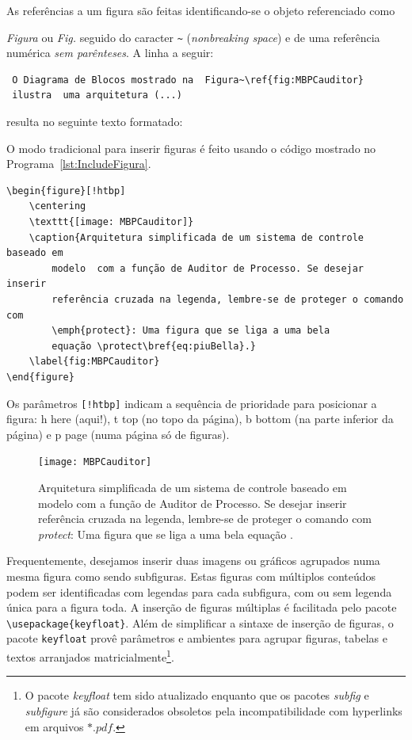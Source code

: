As referências a um figura  são feitas identificando-se o objeto referenciado como {\emph{Figura} ou \emph{Fig. } seguido do caracter \verb|~| (\emph{nonbreaking space}) e de uma referência numérica \textit{sem parênteses}. 
A linha a seguir:

\begin{verbatim}
 O Diagrama de Blocos mostrado na  Figura~\ref{fig:MBPCauditor} 
 ilustra  uma arquitetura (...)
\end{verbatim}

resulta no seguinte texto formatado:



O  modo tradicional para inserir figuras é feito usando o código  mostrado  no Programa~\ref{lst:IncludeFigura}.

\begin{lstlisting}[language={[Latex]Tex},frame=single,numbers =none, caption= {Sintaxe clássica para inserir uma figura.},label=lst:IncludeFigura]
\begin{figure}[!htbp]
	\centering
	\texttt{[image: MBPCauditor]} 
	\caption{Arquitetura simplificada de um sistema de controle baseado em 
		modelo 	com a função de Auditor de Processo. Se desejar inserir 
		referência cruzada na legenda, lembre-se de proteger o comando com 
		\emph{protect}: Uma figura que se liga a uma bela 
		equação \protect\bref{eq:piuBella}.}
	\label{fig:MBPCauditor}
\end{figure}
\end{lstlisting}

Os parâmetros \verb|[!htbp]| indicam a sequência de prioridade para posicionar a figura: \textsf{h} here (aqui!), \textsf{t} top (no topo da página), \textsf{b} bottom (na parte inferior da página) e \textsf{p} page (numa página só de figuras).
\begin{figure}[!htbp]
	\centering
	\texttt{[image: MBPCauditor]} 
	\caption{Arquitetura simplificada de um sistema de controle baseado em modelo com a função de Auditor de Processo. Se desejar inserir referência cruzada na legenda, lembre-se de proteger o comando com \emph{protect}: Uma figura que se liga a uma bela equação \protect{}.}
	\label{fig:MBPCauditor}
\end{figure}
Frequentemente, desejamos  inserir duas imagens ou gráficos agrupados numa mesma figura como sendo subfiguras. Estas figuras com múltiplos conteúdos podem ser identificadas com legendas para cada subfigura, com ou sem legenda única para a figura toda.  A inserção de figuras múltiplas é facilitada pelo pacote \verb|\usepackage{keyfloat}|. Além de simplificar a sintaxe de inserção de figuras, o pacote \verb|keyfloat| provê parâmetros e ambientes para agrupar figuras, tabelas e textos arranjados matricialmente\footnote{O pacote \emph{keyfloat} tem sido atualizado enquanto que os pacotes \emph{subfig} e \emph{subfigure} já são considerados obsoletos pela incompatibilidade com hyperlinks em arquivos $*.pdf$.}.

}
